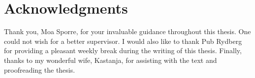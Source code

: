 \section*{Acknowledgments}
Thank you, Moa Sporre, for your invaluable guidance throughout this thesis. One could not wish for a better supervisor. I would also like to thank Pub Rydberg for providing a pleasant weekly break during the writing of this thesis. Finally, thanks to my wonderful wife, Kastanja, for assisting with the text and proofreading the thesis.
